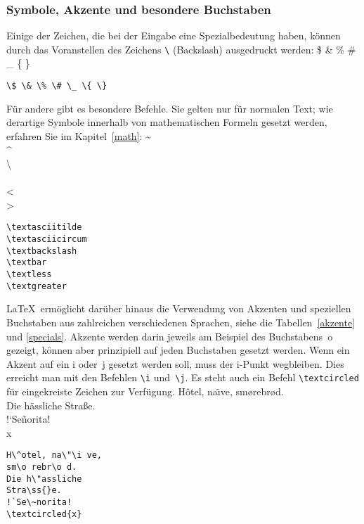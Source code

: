 \subsubsection{Symbole, Akzente und besondere Buchstaben}\label{symbole}

Einige der Zeichen, die bei der Eingabe eine Spezialbedeutung haben,
können durch das Voranstellen des
Zeichens \verb|\| (Backslash) ausgedruckt werden:
\exa
\$ \& \% \# \_ \{ \}
\exb
\begin{verbatim}
\$ \& \% \# \_ \{ \}
\end{verbatim}
\exc
Für andere gibt es besondere Befehle.  Sie gelten nur für normalen
Text; wie derartige Symbole innerhalb von mathematischen
Formeln gesetzt werden, erfahren Sie im Kapitel~\ref{math}:
\exa
\textasciitilde \\
\textasciicircum \\
\textbackslash \\
\textbar \\ 
\textless\\
\textgreater
\exb
\begin{verbatim}
\textasciitilde
\textasciicircum
\textbackslash 
\textbar  
\textless  
\textgreater
\end{verbatim}
\exc

\LaTeX\ ermöglicht darüber hinaus die Verwendung von Akzenten 
und speziellen Buchstaben aus zahlreichen verschiedenen Sprachen, 
siehe die Tabellen~\ref{akzente}  und \ref{specials}.
Akzente werden darin jeweils am Beispiel
des Buchstabens~o gezeigt, können aber prinzipiell auf jeden
Buchstaben gesetzt werden.
Wenn ein Akzent auf ein i oder~j gesetzt werden soll, muss der
\mbox{i-Punkt} wegbleiben. Dies erreicht man mit den Befehlen
\verb|\i| und~\verb|\j|.
Es steht auch ein Befehl \verb|\textcircled| für 
eingekreiste Zeichen zur Verfügung.
\exa
\umlauthigh %
Hôtel, na\"\i ve, smørebrød.\\[1\baselineskip]
\umlautlow
Die hässliche Straße.\\[1\baselineskip]
!`Señorita!\\
\textcircled{x}
\exb
\begin{verbatim}
H\^otel, na\"\i ve,
sm\o rebr\o d.
Die h\"assliche
Stra\ss{}e.
!`Se\~norita!
\textcircled{x}
\end{verbatim}
\exc

